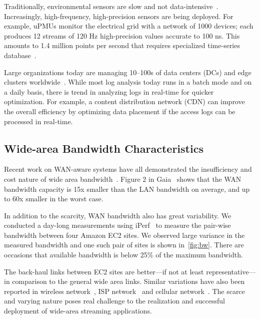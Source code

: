  Traditionally, environmental sensors are slow
and not data-intensive~\cite{atzori2010internet}. Increasingly, high-frequency,
high-precision sensors are being deployed. For example, uPMUs monitor the
electrical grid with a network of 1000 devices; each produces 12 streams of 120
Hz high-precision values accurate to 100 ns. This amounts to 1.4 million points
per second that requires specialized time-series
database~\cite{andersen2016btrdb}.

 Large organizations today are managing 10--100s of
data centers (DCs) and edge clusters worldwide~\cite{calder2013mapping}. While
most log analysis today runs in a batch mode and on a daily basis, there is
trend in analyzing logs in real-time for quicker optimization. For example, a
content distribution network (CDN) can improve the overall efficiency by
optimizing data placement if the access logs can be processed in real-time.


\subsection{Wide-area Bandwidth Characteristics}
\label{sec:wide-area-bandwidth}

Recent work on WAN-aware systems have all demonstrated the insufficiency and
cost nature of wide area bandwidth~\cite{pu2015low, vulimiri2015global}. Figure
2 in Gaia~\cite{hsieh17gaia} shows that the WAN bandwidth capacity is 15x
smaller than the LAN bandwidth on average, and up to 60x smaller in the worst
case.

In addition to the scarcity, WAN bandwidth also has great variability. We
conducted a day-long measurements using iPerf~\cite{iperf3} to measure the
pair-wise bandwidth between four Amazon EC2 sites. We observed large variance in
the measured bandwidth and one such pair of sites is shown
in~\autoref{fig:bw}. There are occasions that available bandwidth is below 25\%
of the maximum bandwidth.

The back-haul links between EC2 sites are better---if not at least
representative---in comparison to the general wide area links. Similar
variations have also been reported in wireless network~\cite{biswas2015large},
ISP network~\cite{grover2013peeking} and cellular
network~\cite{nikravesh2014mobile}. The scarce and varying nature poses real
challenge to the realization and successful deployment of wide-area streaming
applications.


